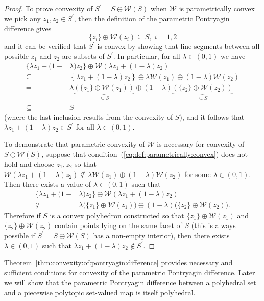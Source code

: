 \documentclass[final]{elsarticle}
\theoremstyle{remark}
\theoremstyle{definition}
\begin{document}
\begin{proof}
To prove convexity of $S^\prime =  S\ominus \mathcal W( S)$ when $\mathcal W$ is parametrically convex we pick any $z_1,z_2\in S^\prime$, then
the definition of the parametric Pontryagin difference gives
\begin{equation}
  \{z_i\} \oplus \mathcal W(z_i) \subseteq S,\; i=1,2 
\end{equation}
%
and it can be verified that $S^\prime$ is convex by showing that line segments between all possible $z_1$ and $z_2$ are subsets of $S^\prime$. In particular, for all $\lambda \in (0,1)$ we have
\begin{align*}
  \{ \lambda z_1 + (1-&\lambda)z_2
  \}\oplus \mathcal W\left( \lambda z_1 + (1-\lambda)z_2\right)\\
  \subseteq&\left\{ \lambda z_1 + (1-\lambda)z_2
  \right\}\oplus \lambda \mathcal W(z_1) \oplus (1-\lambda)
  \mathcal W(z_2)\\
 = &\lambda\underbrace{(\{z_1\}\oplus \mathcal W(z_1))}_{\subseteq S}\oplus
  (1-\lambda)\underbrace{(\{z_2\}\oplus \mathcal W(z_2))}_{\subseteq S}\\
  \subseteq& S
\end{align*}
%
(where the last inclusion results from the convexity of $S$), and it follows that
$\lambda z_1 + (1-\lambda) z_2 \in S^\prime$ for all $\lambda \in (0,1)$. 
%

To demonstrate that parametric convexity of $\mathcal W$ is necessary for convexity of $S\ominus \mathcal W(S)$, suppose that condition~(\ref{eq:def:parametrically:convex}) does not hold and choose $z_1,z_2$ so that $\mathcal W(\lambda z_1 + (1-\lambda) z_2) \not\subseteq \lambda \mathcal W(z_1) \oplus (1-\lambda) \mathcal W (z_2)$ for some $\lambda \in (0,1)$. Then there exists a value of $\lambda\in(0,1)$ such that
\begin{align*}
  \{ \lambda z_1 + (1-&\lambda)z_2
  \}\oplus \mathcal W\left( \lambda z_1 + (1-\lambda)z_2\right)\\
 \not\subseteq &\lambda\bigl(\{z_1\}\oplus \mathcal W(z_1)\bigr)\oplus
  (1-\lambda)\bigl(\{z_2\}\oplus \mathcal W(z_2)\bigr) .
\end{align*}
Therefore if $S$ is a convex polyhedron constructed so that $\{z_1\}\oplus\mathcal W(z_1)$ and $\{z_2\}\oplus\mathcal W(z_2)$ contain points lying on the same facet of $S$ (this is always possible if $S^\prime=S\ominus \mathcal W(S)$ has a non-empty interior), then there exists $\lambda \in (0,1)$ such that $\lambda z_1 + (1-\lambda) z_2 \notin S^\prime$.
%
\end{proof}
%
Theorem~\ref{thm:convexity:of:pontryagin:difference} provides necessary and sufficient conditions for convexity of the parametric Pontryagin difference. 
%
Later we will show that the parametric Pontryagin difference between a polyhedral set and a piecewise polytopic set-valued map is itself polyhedral.
%
%
%
%
\end{document}
